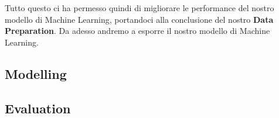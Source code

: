 \documentclass[12pt]{article}
\begin{document}
Tutto questo ci ha permesso quindi di migliorare le performance del nostro modello di Machine Learning, portandoci alla conclusione del nostro \textbf{Data Preparation}. Da adesso andremo a esporre il nostro modello di
Machine Learning.

\subsection{Modelling}


\subsection{Evaluation}
\end{document}
